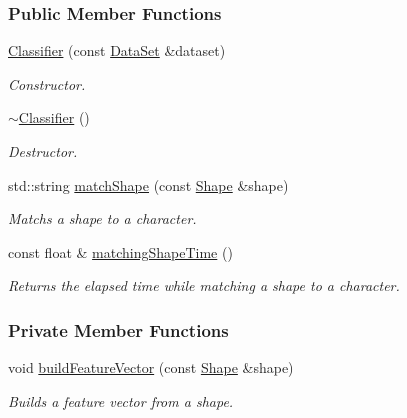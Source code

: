 \subsubsection*{Public Member Functions}
\begin{CompactItemize}
\item 
\hyperlink{class_classifier_9e4bb9d0578609751dfb7cffb77b804f}{Classifier} (const \hyperlink{class_data_set}{DataSet} \&dataset)
\begin{CompactList}\small\item\em Constructor. \item\end{CompactList}\item 
\hyperlink{class_classifier_7831f2accc6c1e98ba11ba5ee67f6d0c}{$\sim$Classifier} ()
\begin{CompactList}\small\item\em Destructor. \item\end{CompactList}\item 
std::string \hyperlink{class_classifier_6fd6a8332d3188ac605ff452ab6dc9c2}{matchShape} (const \hyperlink{class_shape}{Shape} \&shape)
\begin{CompactList}\small\item\em Matchs a shape to a character. \item\end{CompactList}\item 
const float \& \hyperlink{class_classifier_775756b0f6e5472a13bb1fa15290f14c}{matchingShapeTime} ()
\begin{CompactList}\small\item\em Returns the elapsed time while matching a shape to a character. \item\end{CompactList}\end{CompactItemize}
\subsubsection*{Private Member Functions}
\begin{CompactItemize}
\item 
void \hyperlink{class_classifier_6c5a7ef6298b0f0d84873297f1e8c7e9}{buildFeatureVector} (const \hyperlink{class_shape}{Shape} \&shape)
\begin{CompactList}\small\item\em Builds a feature vector from a shape. \item\end{CompactList}\end{CompactItemize}
